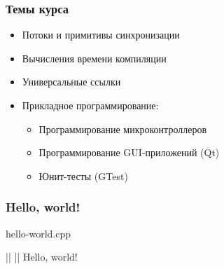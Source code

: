 \documentclass[compress, aspectratio=169]{beamer}
\begin{document}
\begin{frame}

    \frametitle{Темы курса}

    \begin{itemize}

        \item Потоки и примитивы синхронизации

        \item Вычисления времени компиляции

        \item Универсальные ссылки

        \item Прикладное программирование:

            \begin{itemize}

                \item Программирование микроконтроллеров

                \item Программирование GUI-приложений (Qt)

                \item Юнит-тесты (GTest)

            \end{itemize}

    \end{itemize}

\end{frame}

\begin{frame}[fragile]

    \frametitle{Hello, world!}

        {hello-world.cpp}

    \begin{terminalwindow}[||]
||
||
Hello, world!
    \end{terminalwindow}

\end{frame}
\end{document}
